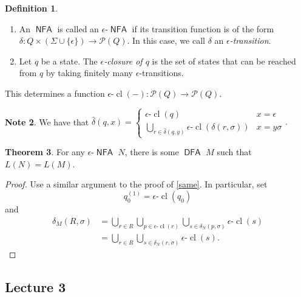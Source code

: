\documentclass[10pt,letterpaper,cm]{nupset}
\theoremstyle{definition}
\newtheorem{definition}{Definition}[subsection]
\newtheorem{note}[definition]{Note}
\theoremstyle{theorem}
\newtheorem{theorem}[definition]{Theorem}
\theoremstyle{remark}
\renewcommand{\P}{\mathcal P}
\newcommand{\1}{\mathbf{1}}
\newcommand{\0}{\vec 0}
\DeclareMathOperator{\cl}{cl}
\DeclareMathOperator{\DFA}{\mathsf{DFA}}
\DeclareMathOperator{\NFA}{\mathsf{NFA}}
\begin{document}
\begin{definition} $ $
\begin{enumerate}
\item An $\NFA$ is called an \textit{$\epsilon{\text{-}}\NFA$} if its transition function is of the form $\delta: Q\times \left(\Sigma \cup \{\epsilon\}\right) \to \P(Q)$. In this case, we call $\delta$ an \textit{$\epsilon$-transition}.
\item  Let $q$ be a state. The \textit{$\epsilon$-closure of $q$} is the set of states that can be reached from $q$ by taking finitely many $\epsilon$-transitions. 
\end{enumerate}
\end{definition}

This determines a function $\epsilon{\text{-}}\cl(-): \P(Q) \to \P(Q)$.

\smallskip

\begin{note}
We have that $\hat{\delta}(q, x) = \begin{cases} \epsilon \text{-}\cl(q) & x = \epsilon
\\ \bigcup_{r\in \hat{\delta}(q, y)} \epsilon \text{-}\cl(\delta(r, \sigma)) & x = y\sigma 
\end{cases}.$
\end{note}

\begin{theorem}
For any $\epsilon{\text{-}}\NFA$ $N$, there is some $\DFA$ $M$ such that $L(N) = L(M)$.
\end{theorem}
\begin{proof}
Use a similar argument to the proof of \cref{same}. In particular, set $$q_0^{(1)} = \epsilon \text{-}\cl(q_0)$$ and 
\begin{align*}
\delta_M(R, \sigma)  & =  \bigcup_{r\in R}\bigcup_{p\in \epsilon \text{-}\cl(r)} \bigcup_{s\in \delta_N(p, \sigma)} \epsilon \text{-}\cl(s)
\\ & = \bigcup_{r\in R} \bigcup_{s\in \delta_N(r, \sigma)} \epsilon \text{-}\cl(s)
.\end{align*}
\end{proof}

\subsection{Lecture 3}
\end{document}
